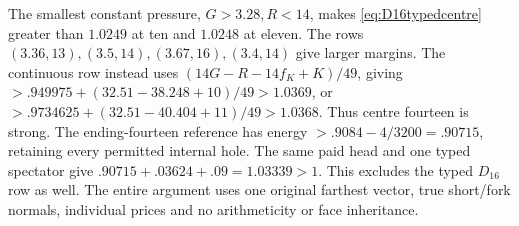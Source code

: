 The smallest constant pressure, \(G>3.28,R<14\), makes
\eqref{eq:D16typedcentre} greater than \(1.0249\) at ten and
\(1.0248\) at eleven. The rows \((3.36,13),(3.5,14),
(3.67,16),(3.4,14)\) give larger margins. The continuous row
instead uses \((14G-R-14f_K+K)/49\), giving
\(>.949975+(32.51-38.248+10)/49>1.0369\), or
\(>.9734625+(32.51-40.404+11)/49>1.0368\).
Thus centre fourteen is strong. The ending-fourteen reference has
energy \(>.9084-4/3200=.90715\), retaining every permitted
internal hole. The same paid head and one typed spectator give
\(.90715+.03624+.09=1.03339>1\).
This excludes the typed \(D_{16}\) row as well. The entire
argument uses one original farthest vector, true short/fork normals,
individual prices and no arithmeticity or face inheritance.
